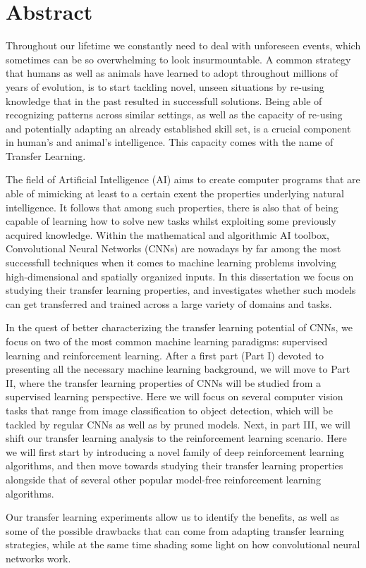 


\begingroup
\let\clearpage\relax
\let\cleardoublepage\relax
\let\cleardoublepage\relax

\chapter*{Abstract}
Throughout our lifetime we constantly need to deal with unforeseen events, which sometimes can be so overwhelming to look insurmountable. A common strategy that humans as well as animals have learned to adopt throughout millions of years of evolution, is to start tackling novel, unseen situations by re-using knowledge that in the past resulted in successfull solutions. Being able of recognizing patterns across similar settings, as well as the capacity of re-using and potentially adapting an already established skill set, is a crucial component in human's and animal's intelligence. This capacity comes with the name of Transfer Learning. 

The field of Artificial Intelligence (AI) aims to create computer programs that are able of mimicking at least to a certain exent the properties underlying natural intelligence. It follows that among such properties, there is also that of being capable of learning how to solve new tasks whilst exploiting some previously acquired knowledge. Within the mathematical and algorithmic AI toolbox, Convolutional Neural Networks (CNNs) are nowadays by far among the most successfull techniques when it comes to machine learning problems involving high-dimensional and spatially organized inputs. In this dissertation we focus on studying their transfer learning properties, and investigates whether such models can get transferred and trained across a large variety of domains and tasks.

In the quest of better characterizing the transfer learning potential of CNNs, we focus on two of the most common machine learning paradigms: supervised learning and reinforcement learning. After a first part (Part I) devoted to presenting all the necessary machine learning background, we will move to Part II, where the transfer learning properties of CNNs will be studied from a supervised learning perspective. Here we will focus on several computer vision tasks that range from image classification to object detection, which will be tackled by regular CNNs as well as by pruned models. Next, in part III, we will shift our transfer learning analysis to the reinforcement learning scenario. Here we will first start by introducing a novel family of deep reinforcement learning algorithms, and then move towards studying their transfer learning properties alongside that of several other popular model-free reinforcement learning algorithms. 

Our transfer learning experiments allow us to identify the benefits, as well as some of the possible drawbacks that can come from adapting transfer learning strategies, while at the same time shading some light on how convolutional neural networks work. 

\endgroup			

\vfill
